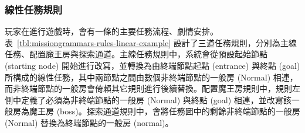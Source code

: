\subsubsection{線性任務規則}
\label{sssec:method-missiongrammars-rules-linearrules}

玩家在進行遊戲時，會有一條的主要任務流程、劇情安排。表~\ref{tbl:missiongrammars-rules-linear-example} 設計了三道任務規則，分別為主線任務、配置魔王房與探索通道。主線任務規則中，系統會從預設起始節點 (starting node) 開始進行改寫，並轉換為由終端節點起點 (entrance) 與終點 (goal) 所構成的線性任務，其中兩節點之間由數個非終端節點的一般房 (Normal) 相連，而非終端節點的一般房會倚賴其它規則進行後續替換。配置魔王房規則中，規則左側中定義了必須為非終端節點的一般房 (Normal) 與終點 (goal) 相連，並改寫該一般房為魔王房 (boss)。探索通道規則中，會將任務圖中的剩餘非終端節點的一般房 (Normal) 替換為終端節點的一般房 (normal)。

